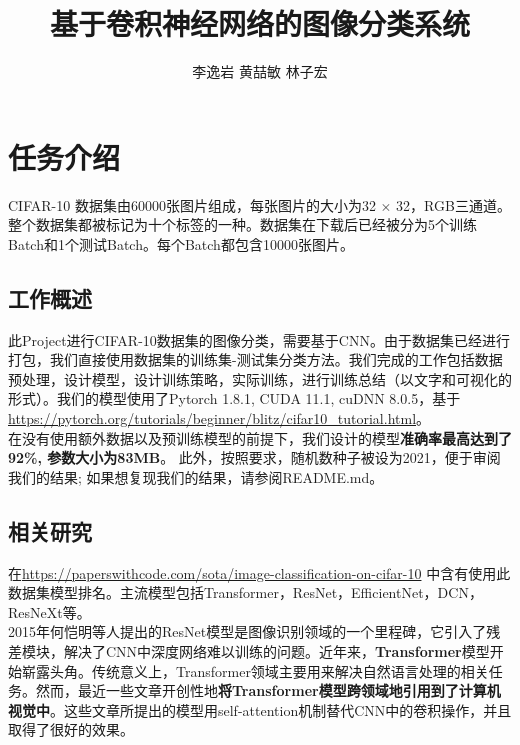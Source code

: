\documentclass[hyperref, UTF8, 12pt]{article}
\theoremstyle{definition}
\begin{document}
\title{基于卷积神经网络的图像分类系统}
\author{李逸岩 黄喆敏 林子宏}
\maketitle

\section{任务介绍}
CIFAR-10 数据集由60000张图片组成，每张图片的大小为32 $\times$ 32，RGB三通道。整个数据集都被标记为十个标签的一种。数据集在下载后已经被分为5个训练Batch和1个测试Batch。每个Batch都包含10000张图片。\cite{krizhevsky2009learning}

\subsection{工作概述}
此Project进行CIFAR-10数据集的图像分类，需要基于CNN。由于数据集已经进行打包，我们直接使用数据集的训练集-测试集分类方法。我们完成的工作包括数据预处理，设计模型，设计训练策略，实际训练，进行训练总结（以文字和可视化的形式）。我们的模型使用了Pytorch 1.8.1, CUDA 11.1, cuDNN 8.0.5，基于\url{https://pytorch.org/tutorials/beginner/blitz/cifar10_tutorial.html}。 \\
\indent
在没有使用额外数据以及预训练模型的前提下，我们设计的模型\textbf{准确率最高达到了92\%, 参数大小为83MB}。 此外，按照要求，随机数种子被设为2021，便于审阅我们的结果; 如果想复现我们的结果，请参阅README.md。

\subsection {相关研究}
在\url{https://paperswithcode.com/sota/image-classification-on-cifar-10} 中含有使用此数据集模型排名。主流模型包括Transformer\cite{dosovitskiy2021image}，ResNet\cite{kolesnikov2020big}，EfficientNet\cite{tan2021efficientnetv2}，DCN\cite{sousa2021cnn}，ResNeXt\cite{Li_2019_CVPR}等。\\

\indent 2015年何恺明等人提出的ResNet模型\cite{resnet2016}是图像识别领域的一个里程碑，它引入了残差模块，解决了CNN中深度网络难以训练的问题。近年来，\textbf{Transformer}模型开始崭露头角。传统意义上，Transformer领域主要用来解决自然语言处理的相关任务。然而，最近一些文章开创性地\textbf{将Transformer模型跨领域地引用到了计算机视觉中}。这些文章所提出的模型用self-attention机制替代CNN中的卷积操作，并且取得了很好的效果。\cite{dosovitskiy2021image}
\end{document}
